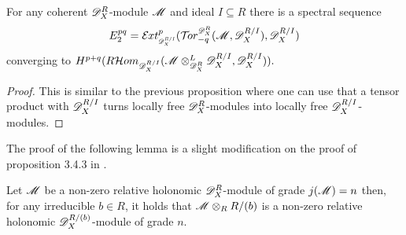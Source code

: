 \begin{proposition}
  For any coherent $\mathscr{D}_X^R$-module $\mathscr{M}$ and ideal $I\subseteq R$ there is a spectral sequence
  $$E_2^{pq}= \Ex{\D_X^{R/I}}{p}(\Tr{\D_X^R}{-q}(\M,\D_X^{R/I}), \D_X^{R/I}) $$
  converging to $H^{p+q}(R\mathcal{H}om_{\mathscr{D}_X^{R/I}}(\mathscr{M}\otimes_{\mathscr{D}_X^R}^L \mathscr{D}_X^{R/I},\mathscr{D}_X^{R/I})).$
\end{proposition}
\begin{proof}
  This is similar to the previous proposition where one can use that a tensor product with $\mathscr{D}_X^{R/I}$ turns locally free $\mathscr{D}_X^R$-modules into locally free $\mathscr{D}_X^{R/I}$-modules.
\end{proof}

The proof of the following lemma is a slight modification on the proof of proposition 3.4.3 in \cite{budur2019zero}.
\begin{lemma}\label{lem: RestrictToCM}
  Let $\mathscr{M}$ be a non-zero relative holonomic $\mathscr{D}_X^R$-module of grade $j(\mathscr{M}) = n$  then, for any irreducible $b\in R$, it holds that $\mathscr{M} \otimes_R R/(b)$ is a non-zero relative holonomic  $\mathscr{D}_X^{R/(b)}$-module of grade $n$.
\end{lemma}
